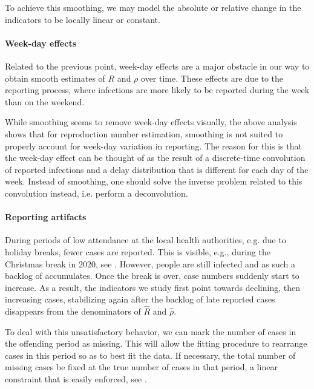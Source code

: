 To achieve this smoothing, we may model the absolute or relative change in the indicators to be locally linear or constant. 

\paragraph{Week-day effects}
Related to the previous point, week-day effects are a major obstacle in our way to obtain smooth estimates of $R$ and $\rho$ over time. These effects are due to the reporting process, where infections are more likely to be reported during the week than on the weekend. 

While smoothing seems to remove week-day effects visually, the above analysis shows that for reproduction number estimation, smoothing is not suited to properly account for week-day variation in reporting. The reason for this is that the week-day effect can be thought of as the result of a discrete-time convolution of reported infections and a delay distribution that is different for each day of the week. Instead of smoothing, one should solve the inverse problem related to this convolution instead, i.e. perform a deconvolution. 

\paragraph{Reporting artifacts}
During periods of low attendance at the local health authorities, e.g. due to holiday breaks, fewer cases are reported. This is visible, e.g., during the Christmas break in 2020, see . However, people are still infected and as such a backlog of accumulates. Once the break is over, case numbers suddenly start to increase. As a result, the indicators we study first point towards declining, then increasing cases, stabilizing again after the backlog of late reported cases disappears from the denominators of $\hat R$ and $\hat \rho$. 

To deal with this unsatisfactory behavior, we can mark the number of cases in the offending period as missing. This will allow the fitting procedure to rearrange cases in this period so as to best fit the data. If necessary, the total number of missing cases be fixed at the true number of cases in that period, a linear constraint that is easily enforced, see .
\bigskip

